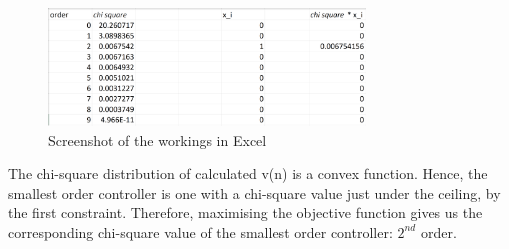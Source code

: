 \documentclass[12pt,a4paper]{article}
\begin{document}
    \begin{figure}[H]
    	\begin{center}
    		\includegraphics[width=0.75\textwidth]{xcel.png}
    		\caption{Screenshot of the workings in Excel}
    		\label{fig:xcel}
    	\end{center}
    \end{figure}
    The chi-square distribution of calculated v(n) is a convex function. Hence, the smallest order controller is one with a chi-square value just under the ceiling, by the first constraint. Therefore, maximising the objective function gives us the corresponding chi-square value of the smallest order controller: $2^{nd}$ order.
	
\end{document}

